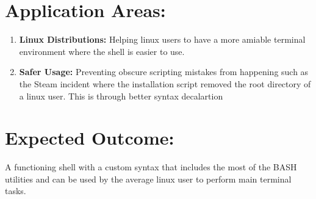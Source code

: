 \documentclass{article}
\begin{document}
\section*{Application Areas:} 

\begin{enumerate}

\item \textbf{Linux Distributions: } Helping linux users to have a more amiable terminal environment where the 
shell is easier to use.

\item \textbf{Safer Usage: } Preventing obscure scripting mistakes from happening such as the Steam incident where
the installation script removed the root directory of a linux user. This is through better syntax decalartion 

\end{enumerate}

\section*{Expected Outcome: } 

A functioning shell with a custom syntax that includes the most of the BASH utilities and can be used by the average
linux user to perform main terminal tasks.
\end{document}
